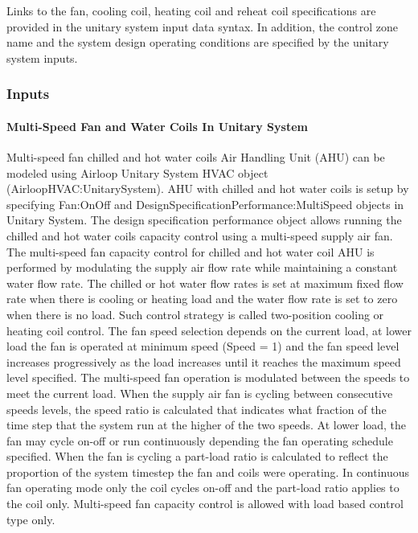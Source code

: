 Links to the fan, cooling coil, heating coil and reheat coil specifications are provided in the unitary system input data syntax. In addition, the control zone name and the system design operating conditions are specified by the unitary system inputs.

\subsubsection{Inputs}\label{inputs-049}

\paragraph{Multi-Speed Fan and Water Coils In Unitary System}\label{multi-speed-fan-and-water-coils-in-unitary-system}

Multi-speed fan chilled and hot water coils Air Handling Unit (AHU) can be modeled using Airloop Unitary System HVAC object (AirloopHVAC:UnitarySystem). AHU with chilled and hot water coils is setup by specifying Fan:OnOff and DesignSpecificationPerformance:MultiSpeed objects in Unitary System. The design specification performance object allows running the chilled and hot water coils capacity control using a multi-speed supply air fan. The multi-speed fan capacity control for chilled and hot water coil AHU is performed by modulating the supply air flow rate while maintaining a constant water flow rate. The chilled or hot water flow rates is set at maximum fixed flow rate when there is cooling or heating load and the water flow rate is set to zero when there is no load. Such control strategy is called two-position cooling or heating coil control. The fan speed selection depends on the current load, at lower load the fan is operated at minimum speed (Speed = 1) and the fan speed level increases progressively as the load increases until it reaches the maximum speed level specified. The multi-speed fan operation is modulated between the speeds to meet the current load. When the supply air fan is cycling between consecutive speeds levels, the speed ratio is calculated that indicates what fraction of the time step that the system run at the higher of the two speeds. At lower load, the fan may cycle on-off or run continuously depending the fan operating schedule specified. When the fan is cycling a part-load ratio is calculated to reflect the proportion of the system timestep the fan and coils were operating. In continuous fan operating mode only the coil cycles on-off and the part-load ratio applies to the coil only. Multi-speed fan capacity control is allowed with load based control type only.

